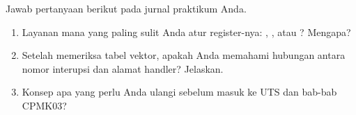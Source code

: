 \begin{refleksibox}
\vspace{1.1em}
Jawab pertanyaan berikut pada jurnal praktikum Anda.
\begin{enumerate}
    \item Layanan mana yang paling sulit Anda atur register-nya:
          , , atau ?
          Mengapa?
    \item Setelah memeriksa tabel vektor, apakah Anda memahami
          hubungan antara nomor interupsi dan alamat handler?
          Jelaskan.
    \item Konsep apa yang perlu Anda ulangi sebelum masuk ke UTS
          dan bab-bab CPMK03?
\end{enumerate}
\end{refleksibox}
